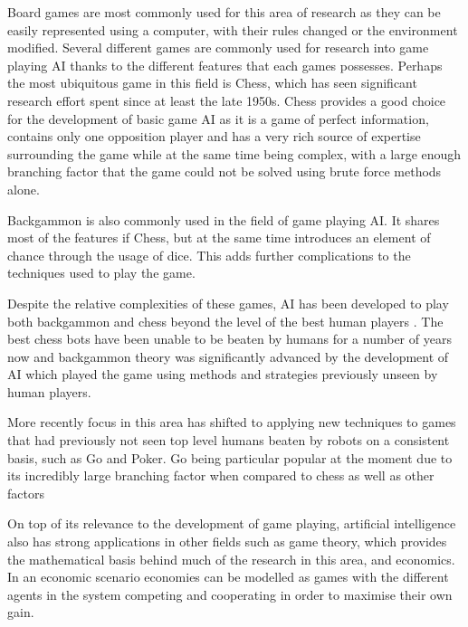 \documentclass[]{article}
\begin{document}
\par Board games are most commonly used for this area of research as they can be easily represented using a computer, with their rules changed or the environment modified. Several different games are commonly used for research into game playing AI thanks to the different features that each games possesses. Perhaps the most ubiquitous game in this field is Chess, which has seen significant research effort spent since at least the late 1950s. Chess provides a good choice for the development of basic game AI as it is a game of perfect information, contains only one opposition player and has a very rich source of expertise surrounding the game while at the same time being complex, with a large enough branching factor that the game could not be solved using brute force methods alone.

\par Backgammon is also commonly used in the field of game playing AI. It shares most of the features if Chess, but at the same time introduces an element of chance through the usage of dice. This adds further complications to the techniques used to play the game.

\par Despite the relative complexities of these games, AI has been developed to play both backgammon and chess beyond the level of the best human players \cite{tesauro1995temporal, campbell2002deep}. The best chess bots have been unable to be beaten by humans for a number of years now and backgammon theory was significantly advanced by the development of AI which played the game using methods and strategies previously unseen by human players.

\par More recently focus in this area has shifted to applying new techniques to games that had previously not seen top level humans beaten by robots on a consistent basis, such as Go and Poker. Go being particular popular at the moment due to its incredibly large branching factor when compared to chess as well as other factors \cite{burmeister1995challenge}

\par On top of its relevance to the development of game playing, artificial intelligence also has strong applications in other fields such as game theory, which provides the mathematical basis behind much of the research in this area, and economics. In an economic scenario economies can be modelled as games with the different agents in the system competing and cooperating in order to maximise their own gain.
\end{document}
